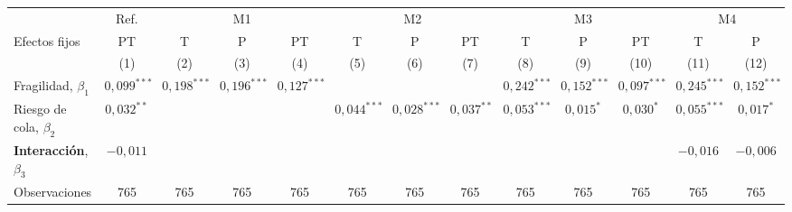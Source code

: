 \begingroup\setlength{\tabcolsep}{3pt}\renewcommand{\arraystretch}{1.3}%
\begin{adjustbox}{max width=0.97\textwidth}
\begin{tabular}{l c ccc ccc ccc cc}
\toprule
 & Ref. & \multicolumn{3}{c}{M1} & \multicolumn{3}{c}{M2} & \multicolumn{3}{c}{M3} & \multicolumn{2}{c}{M4} \\
\cmidrule(lr){2-2}\cmidrule(lr){3-5}\cmidrule(lr){6-8}\cmidrule(lr){9-11}\cmidrule(lr){12-13}
Efectos fijos & PT & T & P & PT & T & P & PT & T & P & PT & T & P \\
 & (1) & (2) & (3) & (4) & (5) & (6) & (7) & (8) & (9) & (10) & (11) & (12) \\
\midrule
Fragilidad, $\beta_1$ & $0{,}099^{***}$ & $0{,}198^{***}$ & $0{,}196^{***}$ & $0{,}127^{***}$ &  &  &  & $0{,}242^{***}$ & $0{,}152^{***}$ & $0{,}097^{***}$ & $0{,}245^{***}$ & $0{,}152^{***}$ \\
Riesgo de cola, $\beta_2$ & $0{,}032^{**}$ &  &  &  & $0{,}044^{***}$ & $0{,}028^{***}$ & $0{,}037^{**}$ & $0{,}053^{***}$ & $0{,}015^{*}$ & $0{,}030^{*}$ & $0{,}055^{***}$ & $0{,}017^{*}$ \\
\textbf{Interacción}, $\beta_3$ & $-0{,}011$ &  &  &  &  &  &  &  &  &  & $-0{,}016$ & $-0{,}006$ \\
\addlinespace
Observaciones & 765 & 765 & 765 & 765 & 765 & 765 & 765 & 765 & 765 & 765 & 765 & 765 \\
\bottomrule
\end{tabular}
\end{adjustbox}\endgroup
